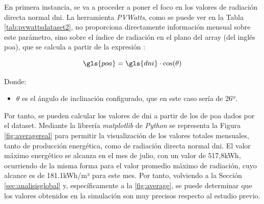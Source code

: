 En primera instancia, se va a proceder a poner el foco en los valores de radiación directa normal \gls{dni}. La herramienta \textit{PVWatts}, como se puede ver en la Tabla \ref{tab:pvwattsdataset2}, no proporciona directamente información mensual sobre este parámetro, sino sobre el índice de radiación en el plano del array (del inglés \gls{poa}), que se calcula a partir de la expresión \cite{poa}:

\[ \gls{poa} = \gls{dni} \cdot \cos(\theta) \]

    Donde:
\begin{itemize}
    \renewcommand{\labelitemi}{}
    \item \( \theta \) es el ángulo de inclinación configurado, que en este caso sería de 26º.
\end{itemize}

\vspace{3mm}

Por tanto, se pueden calcular los valores de \gls{dni} a partir de los de \gls{poa} dados por el dataset. Mediante la librería \textit{matplotlib} de \textit{Python} se representa la Figura \ref{fig:averagereal} para permitir la visualización de los valores totales mensuales, tanto de producción energética, como de radiación directa normal \gls{dni}. El valor máximo energético se alcanza en el mes de julio, con un valor de 517,8kWh, ocurriendo de la misma forma para el valor promedio máximo de radiación, cuyo alcance es de 181.1kWh/m² para este mes. Por tanto, volviendo a la Sección \ref{sec:analisisglobal} y, específicamente a la \ref{fig:average}, se puede determinar que los valores obtenidos en la simulación son muy precisos respecto al estudio previo.

\vspace{3mm}

